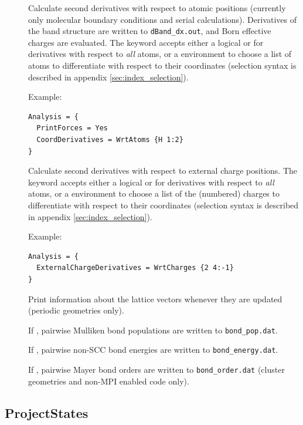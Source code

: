 \begin{description}
\item[] Calculate second derivatives with respect
  to atomic positions (currently only molecular boundary conditions
  and serial calculations). Derivatives of the band structure are
  written to \verb|dBand_dx.out|, and Born effective charges are
  evaluated. The keyword accepts either a logical  or 
  for derivatives with respect to {\em all} atoms, or a
   environment to choose a list of atoms to
  differentiate with respect to their coordinates (selection syntax is
  described in appendix \ref{sec:index_selection}).

  Example:
\begin{verbatim}
Analysis = {
  PrintForces = Yes
  CoordDerivatives = WrtAtoms {H 1:2}
}
\end{verbatim}

\item[] Calculate second derivatives
  with respect to external charge positions. The keyword accepts
  either a logical  or  for derivatives with respect to
  {\em all} atoms, or a  environment to choose a list
  of the (numbered) charges to differentiate with respect to their
  coordinates (selection syntax is described in appendix
  \ref{sec:index_selection}).

  Example:
\begin{verbatim}
Analysis = {
  ExternalChargeDerivatives = WrtCharges {2 4:-1}
}
\end{verbatim}

\item[] Print information about the
  lattice vectors whenever they are updated (periodic geometries only).

\item[] If , pairwise Mulliken bond
  populations are written to \verb|bond_pop.dat|.

\item[] If , pairwise non-SCC bond energies
  are written to \verb|bond_energy.dat|.

\item[] If , pairwise Mayer bond orders are
  written to \verb|bond_order.dat| (cluster geometries and non-MPI
  enabled code only).

\end{description}

\subsection{ProjectStates}
\label{sec:dftbp.ProjectStates}

